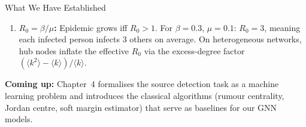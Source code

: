 \begin{conceptbox}{What We Have Established}
\begin{enumerate}[noitemsep]
    \item \textbf{$R_0 = \beta/\mu$:} Epidemic grows iff $R_0 > 1$. For $\beta=0.3$, $\mu=0.1$: $R_0=3$, meaning each infected person infects 3 others on average. On heterogeneous networks, hub nodes inflate the effective $R_0$ via the excess-degree factor $(\langle k^2 \rangle - \langle k \rangle)/\langle k \rangle$.
\end{enumerate}

\textbf{Coming up:} Chapter~4 formalises the source detection task as a machine learning problem and introduces the classical algorithms (rumour centrality, Jordan centre, soft margin estimator) that serve as baselines for our GNN models.
\end{conceptbox}
